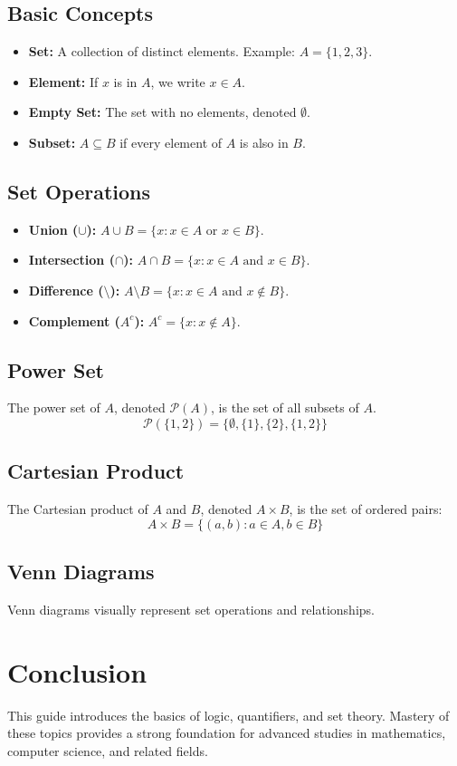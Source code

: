 \documentclass[a4paper,12pt]{article}
\begin{document}
\subsection{Basic Concepts}
\begin{itemize}
    \item \textbf{Set:} A collection of distinct elements. Example: \(A = \{1, 2, 3\}\).
    \item \textbf{Element:} If \(x\) is in \(A\), we write \(x \in A\).
    \item \textbf{Empty Set:} The set with no elements, denoted \(\emptyset\).
    \item \textbf{Subset:} \(A \subseteq B\) if every element of \(A\) is also in \(B\).
\end{itemize}

\subsection{Set Operations}
\begin{itemize}
    \item \textbf{Union (\(\cup\)):} \(A \cup B = \{x : x \in A \text{ or } x \in B\}\).
    \item \textbf{Intersection (\(\cap\)):} \(A \cap B = \{x : x \in A \text{ and } x \in B\}\).
    \item \textbf{Difference (\(\setminus\)):} \(A \setminus B = \{x : x \in A \text{ and } x \notin B\}\).
    \item \textbf{Complement (\(A^c\)):} \(A^c = \{x : x \notin A\}\).
\end{itemize}

\subsection{Power Set}
The power set of \(A\), denoted \(\mathcal{P}(A)\), is the set of all subsets of \(A\).
\[\mathcal{P}(\{1, 2\}) = \{\emptyset, \{1\}, \{2\}, \{1, 2\}\}\]

\subsection{Cartesian Product}
The Cartesian product of \(A\) and \(B\), denoted \(A \times B\), is the set of ordered pairs:
\[A \times B = \{(a, b) : a \in A, b \in B\}\]

\subsection{Venn Diagrams}
Venn diagrams visually represent set operations and relationships.

\section{Conclusion}
This guide introduces the basics of logic, quantifiers, and set theory. Mastery of these topics provides a strong foundation for advanced studies in mathematics, computer science, and related fields.
\end{document}

